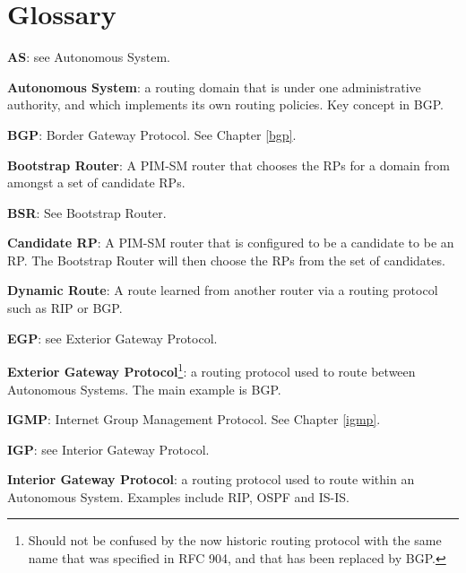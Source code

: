 %
%

\chapter*{Glossary}
\begin{description}

  \item{\bf AS}: see Autonomous System.

  \item{\bf Autonomous System}: a routing domain that is under one
  administrative authority, and which implements its own routing
  policies.  Key concept in BGP.

  \item{\bf BGP}: Border Gateway Protocol.  See Chapter \ref{bgp}.

  \item{\bf Bootstrap Router}: A PIM-SM router that chooses the RPs for
  a domain from amongst a set of candidate RPs.

  \item{\bf BSR}: See Bootstrap Router.

  \item{\bf Candidate RP}: A PIM-SM router that is configured to be a
  candidate to be an RP.  The Bootstrap Router will then choose the
  RPs from the set of candidates.

  \item{\bf Dynamic Route}: A route learned from another router via a
  routing protocol such as RIP or BGP.

  \item{\bf EGP}: see Exterior Gateway Protocol.

  \item{\bf Exterior Gateway Protocol}\footnote{Should not be confused by the
  now historic routing protocol with the same name that was specified in RFC
  904, and that has been replaced by BGP.}: a routing protocol used to route
  between Autonomous Systems.  The main example is BGP.

  \item{\bf IGMP}: Internet Group Management Protocol.  See Chapter
  \ref{igmp}.

  \item{\bf IGP}: see Interior Gateway Protocol.

  \item{\bf Interior Gateway Protocol}: a routing protocol used to route
  within an Autonomous System.  Examples include RIP, OSPF and IS-IS.


\end{description}

